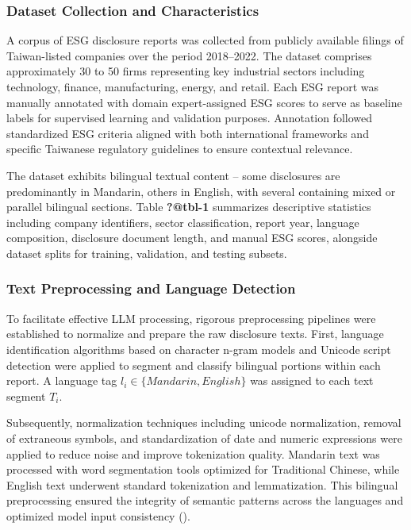 \documentclass[
  12pt,
]{article}
\begin{document}
\subsubsection{Dataset Collection and
Characteristics}\label{dataset-collection-and-characteristics}

A corpus of ESG disclosure reports was collected from publicly available
filings of Taiwan-listed companies over the period 2018--2022. The
dataset comprises approximately 30 to 50 firms representing key
industrial sectors including technology, finance, manufacturing, energy,
and retail. Each ESG report was manually annotated with domain
expert-assigned ESG scores to serve as baseline labels for supervised
learning and validation purposes. Annotation followed standardized ESG
criteria aligned with both international frameworks and specific
Taiwanese regulatory guidelines to ensure contextual relevance.

The dataset exhibits bilingual textual content -- some disclosures are
predominantly in Mandarin, others in English, with several containing
mixed or parallel bilingual sections. Table \textbf{?@tbl-1} summarizes
descriptive statistics including company identifiers, sector
classification, report year, language composition, disclosure document
length, and manual ESG scores, alongside dataset splits for training,
validation, and testing subsets.

\subsubsection{Text Preprocessing and Language
Detection}\label{text-preprocessing-and-language-detection}

To facilitate effective LLM processing, rigorous preprocessing pipelines
were established to normalize and prepare the raw disclosure texts.
First, language identification algorithms based on character n-gram
models and Unicode script detection were applied to segment and classify
bilingual portions within each report. A language tag
\(l_i \in \{Mandarin, English\}\) was assigned to each text segment
\(T_i\).

Subsequently, normalization techniques including unicode normalization,
removal of extraneous symbols, and standardization of date and numeric
expressions were applied to reduce noise and improve tokenization
quality. Mandarin text was processed with word segmentation tools
optimized for Traditional Chinese, while English text underwent standard
tokenization and lemmatization. This bilingual preprocessing ensured the
integrity of semantic patterns across the languages and optimized model
input consistency ().
\end{document}

